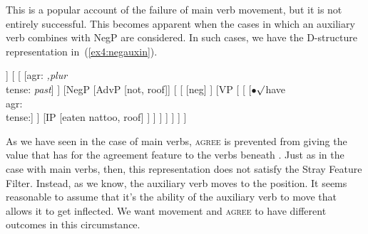 This is a popular account of the failure of main verb movement, but it is not entirely successful. This becomes apparent when the cases in which an auxiliary verb combines with NegP are considered. In such cases, we have the D-structure representation in~(\ref{ex4:negauxin}).
\begin{exe}
\ex \label{ex4:negauxin}
\small
\begin{forest}
[TP
	[DP [they, roof]]
	[ 
		[ [agr: \emph{,plur}\\ tense: \emph{past}] ]
		[NegP
			[AdvP [not, roof]]
			[
				[ [neg] ]
				[VP [
					[ [$\bullet$$\surd$have\\ agr: \\ tense:] ]
					[IP [eaten nattoo, roof] ]
				] ]
			 ]
		 ]
	]
]
\end{forest}
\end{exe}
As we have seen in the case of main verbs, \textsc{agree} is prevented from giving the value that  has for the agreement feature to the verbs beneath . Just as in the case with main verbs, then, this representation does not satisfy the Stray Feature Filter. Instead, as we know, the auxiliary verb moves to the  position. It seems reasonable to assume that it's the ability of the auxiliary verb to move that allows it to get inflected. We want movement and \textsc{agree} to have different outcomes in this circumstance.

